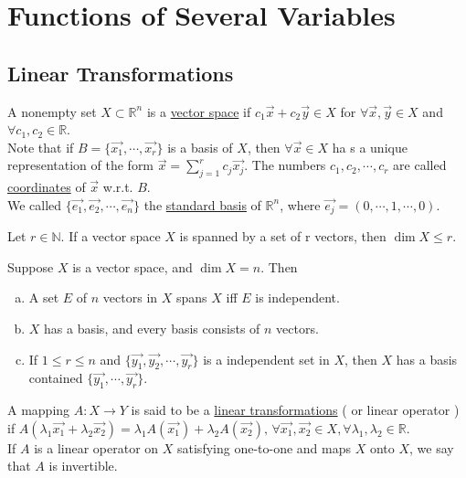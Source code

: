 \section{Functions of Several Variables}
\subsection{Linear Transformations}
A nonempty set  $ X \subset \mathbb{R }^n  $ is a \underline{vector space} if  $ c_1\vec{x }+c_2\vec{y }\in X$ for  $ \forall \vec{x },\vec{y }\in X $ and  $ \forall c_1,c_2\in\mathbb{R } $.\\
Note that if  $ B=\{\vec{x_1},\cdots,\vec{x_r }\} $ is a basis of  $ X  $, then  $ \forall \vec{x }\in X $ ha s a unique representation of the form  $ \vec{x }=\sum\limits_{j=1 }^{r } c_j \vec{x_j } $. The numbers  $ c_1,c_2,\cdots,c_r  $ are called \underline{coordinates} of  $ \vec{x} $ w.r.t.  $ B $.\\
We called  $ \{\vec{e_1 },\vec{e_2 },\cdots,\vec{e_n }\} $ the \underline{standard basis} of  $ \mathbb{R}^n $, where  $ \vec{e_j}=(0,\cdots,1,\cdots,0) $.
\begin{theorem}
    Let  $ r\in\mathbb{N }.  $ If a vector space  $ X  $ is spanned by a set of r vectors, then  $ \dim{X}  \leqslant r $. 
\end{theorem}  
\begin{theorem}
    Suppose  $ X  $ is a vector space, and  $ \dim{X}=n $. Then 
    \begin{enumerate}[(a)]
        \item A set  $ E  $ of  $ n  $ vectors in  $ X  $ spans  $ X  $ iff  $ E  $ is independent.
        \item  $ X  $ has a basis, and every basis consists of  $ n  $ vectors.
        \item If  $ 1 \leqslant r  \leqslant n  $ and  $ \{\vec{y_1},\vec{y_2 },\cdots,\vec{y_r } \} $ is a independent set in  $ X  $, then  $ X  $ has a basis contained  $ \{\vec{y_1},\cdots,\vec{y_r}\} $.  
    \end{enumerate} 
\end{theorem}     
A mapping  $ A:X\rightarrow Y  $ is said to be a \underline{linear transformations} ( or linear operator ) if 
 $ A(\lambda_1 \vec{x_1}+\lambda_2\vec{x_2})=\lambda_1A(\vec{x_1})+\lambda_2A(\vec{x_2}),\,\forall \vec{x_1},\vec{x_2}\in X, \forall \lambda_1,\lambda_2\in\mathbb{R } $.\\
If  $ A  $ is  a linear operator on  $ X  $ satisfying one-to-one and maps  $ X  $ onto  $ X  $, we say that  $ A  $ is invertible.  
